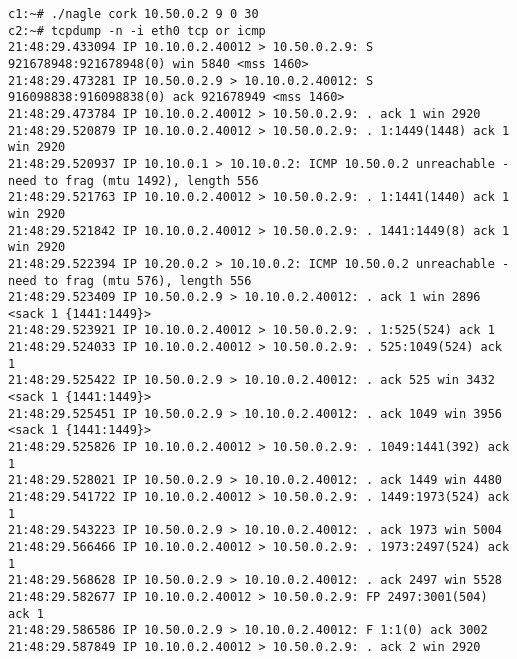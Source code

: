 \documentclass[a4paper,12pt]{article}
\begin{document}
\begin{Verbatim}
c1:~# ./nagle cork 10.50.0.2 9 0 30
c2:~# tcpdump -n -i eth0 tcp or icmp
21:48:29.433094 IP 10.10.0.2.40012 > 10.50.0.2.9: S 921678948:921678948(0) win 5840 <mss 1460>
21:48:29.473281 IP 10.50.0.2.9 > 10.10.0.2.40012: S 916098838:916098838(0) ack 921678949 <mss 1460>
21:48:29.473784 IP 10.10.0.2.40012 > 10.50.0.2.9: . ack 1 win 2920 
21:48:29.520879 IP 10.10.0.2.40012 > 10.50.0.2.9: . 1:1449(1448) ack 1 win 2920
21:48:29.520937 IP 10.10.0.1 > 10.10.0.2: ICMP 10.50.0.2 unreachable - need to frag (mtu 1492), length 556
21:48:29.521763 IP 10.10.0.2.40012 > 10.50.0.2.9: . 1:1441(1440) ack 1 win 2920
21:48:29.521842 IP 10.10.0.2.40012 > 10.50.0.2.9: . 1441:1449(8) ack 1 win 2920
21:48:29.522394 IP 10.20.0.2 > 10.10.0.2: ICMP 10.50.0.2 unreachable - need to frag (mtu 576), length 556
21:48:29.523409 IP 10.50.0.2.9 > 10.10.0.2.40012: . ack 1 win 2896 <sack 1 {1441:1449}>
21:48:29.523921 IP 10.10.0.2.40012 > 10.50.0.2.9: . 1:525(524) ack 1
21:48:29.524033 IP 10.10.0.2.40012 > 10.50.0.2.9: . 525:1049(524) ack 1
21:48:29.525422 IP 10.50.0.2.9 > 10.10.0.2.40012: . ack 525 win 3432 <sack 1 {1441:1449}>
21:48:29.525451 IP 10.50.0.2.9 > 10.10.0.2.40012: . ack 1049 win 3956 <sack 1 {1441:1449}>
21:48:29.525826 IP 10.10.0.2.40012 > 10.50.0.2.9: . 1049:1441(392) ack 1
21:48:29.528021 IP 10.50.0.2.9 > 10.10.0.2.40012: . ack 1449 win 4480
21:48:29.541722 IP 10.10.0.2.40012 > 10.50.0.2.9: . 1449:1973(524) ack 1
21:48:29.543223 IP 10.50.0.2.9 > 10.10.0.2.40012: . ack 1973 win 5004
21:48:29.566466 IP 10.10.0.2.40012 > 10.50.0.2.9: . 1973:2497(524) ack 1
21:48:29.568628 IP 10.50.0.2.9 > 10.10.0.2.40012: . ack 2497 win 5528
21:48:29.582677 IP 10.10.0.2.40012 > 10.50.0.2.9: FP 2497:3001(504) ack 1
21:48:29.586586 IP 10.50.0.2.9 > 10.10.0.2.40012: F 1:1(0) ack 3002
21:48:29.587849 IP 10.10.0.2.40012 > 10.50.0.2.9: . ack 2 win 2920
\end{Verbatim}
\end{document}
